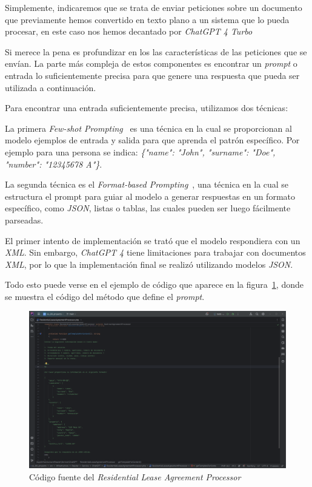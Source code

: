 Simplemente, indicaremos que se trata de enviar peticiones sobre un documento que previamente hemos convertido en texto
plano a un sistema que lo pueda procesar, en este caso nos hemos decantado por \textit{ChatGPT 4 Turbo}~\cite{url_gpt4}

Si merece la pena es profundizar en los las características de las peticiones que se envían.
La parte más compleja de estos componentes es encontrar un \textit{prompt} o entrada lo suficientemente precisa para que
genere una respuesta que pueda ser utilizada a continuación.

Para encontrar una entrada suficientemente precisa, utilizamos dos técnicas:

La primera \textit{Few-shot Prompting}~\cite{article_few_shot_prompting} es una técnica en la cual se proporcionan
al modelo ejemplos de entrada y salida para que aprenda el patrón específico.
Por ejemplo para una persona se indica: \textit{\{"name": "John", "surname": "Doe", "number": "12345678 A"\}}.

La segunda técnica es el \textit{Format-based Prompting}~\cite{article_format_based_prompting}, una técnica en la
cual se estructura el prompt para guiar al modelo a generar respuestas en un formato específico, como \textit{JSON},
listas o tablas, las cuales pueden ser luego fácilmente parseadas.

El primer intento de implementación se trató que el modelo respondiera con un \textit{XML}.
Sin embargo, \textit{ChatGPT 4} tiene limitaciones para trabajar con documentos \textit{XML}, por lo que la
implementación final se realizó utilizando modelos \textit{JSON}.

Todo esto puede verse en el ejemplo de código que aparece en la
figura~\ref{fig:chapter_4.4.residential_lease_agreement_processor}, donde se muestra el código del método que define el
\textit{prompt}.

\begin{figure}[ht]
    \begin{center}
        \includegraphics[width=\textwidth]{./chapter/4/images/chapter_4.4.residential_lease_agreement_processor}
        \caption{Código fuente del \textit{Residential Lease Agreement Processor}}
        \label{fig:chapter_4.4.residential_lease_agreement_processor}
    \end{center}
\end{figure}

